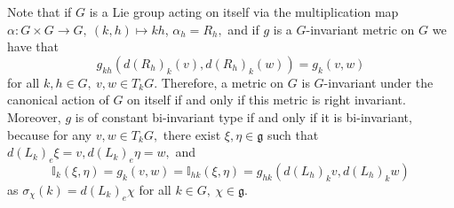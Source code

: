 \documentclass[12pt, letterpaper, reqno]{amsart}
\theoremstyle{definition}
\theoremstyle{plain}
\theoremstyle{remark}
\begin{document}
Note that if $ G $ is a Lie group acting on itself via the multiplication map $ \alpha: G\times G \rightarrow G,\ (k,h) \mapsto kh $, $ \alpha_h = R_h, $ and if $ g $ is a $ G $-invariant metric on $ G $ we have that 
$$ g_{kh} \left( d(R_h)_k(v), d(R_h)_k(w) \right) = g_k(v,w) $$ 
for all $ k,h\in G,\ v,w\in T_kG. $ Therefore, a metric on $ G $ is $ G $-invariant under the canonical action of $ G $ on itself if and only if this metric is right invariant. Moreover, $ g $ is of constant bi-invariant type if and only if it is bi-invariant, because for any $ v,w\in T_kG, $  there exist $ \xi,\eta\in \mathfrak{g} $ such that $ d(L_k)_e\xi=v, d(L_k)_e\eta=w, $ and
$$\mathbb{I}_k(\xi,\eta)= g_k(v,w)= \mathbb{I}_{hk}(\xi,\eta)= g_{hk} \left( d(L_h)_kv, d(L_h)_k w \right) $$
as $ \sigma_\chi(k) = d(L_k)_e\chi $ for all $ k\in G, \ \chi\in \mathfrak{g}. $ 
\end{document}
